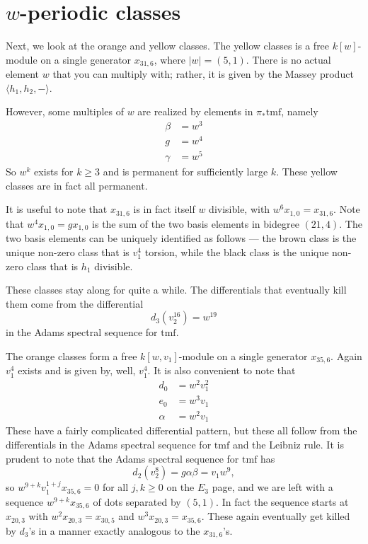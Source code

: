 \documentclass{shortart}
\newcommand\tmf{{\mathrm{tmf}}}
\begin{document}
\section{\texorpdfstring{$w$}{w}-periodic classes}
Next, we look at the orange and yellow classes. The yellow classes is a free $k[w]$-module on a single generator $x_{31, 6}$, where $|w| = (5, 1)$. There is no actual element $w$ that you can multiply with; rather, it is given by the Massey product $\langle h_1, h_2, -\rangle$.

However, some multiples of $w$ are realized by elements in $\pi_*\tmf$, namely
\[
  \begin{aligned}
    \beta &= w^3\\
    g &= w^4\\
    \gamma &= w^5
  \end{aligned}
\]
So $w^k$ exists for $k \geq 3$ and is permanent for sufficiently large $k$. These yellow classes are in fact all permanent.

It is useful to note that $x_{31, 6}$ is in fact itself $w$ divisible, with $w^6 x_{1, 0} = x_{31, 6}$. Note that $w^4 x_{1, 0} = g x_{1, 0}$ is the sum of the two basis elements in bidegree $(21, 4)$. The two basis elements can be uniquely identified as follows --- the brown class is the unique non-zero class that is $v_1^4$ torsion, while the black class is the unique non-zero class that is $h_1$ divisible.

These classes stay along for quite a while. The differentials that eventually kill them come from the differential
\[
  d_3(v_2^{16}) = w^{19}
\]
in the Adams spectral sequence for $\tmf$.

The orange classes form a free $k[w, v_1]$-module on a single generator $x_{35, 6}$. Again $v_1^4$ exists and is given by, well, $v_1^4$. It is also convenient to note that
\[
  \begin{aligned}
    d_0 &= w^2 v_1^2\\
    e_0 &= w^3 v_1\\
    \alpha &= w^2 v_1
  \end{aligned}
\]
These have a fairly complicated differential pattern, but these all follow from the differentials in the Adams spectral sequence for $\tmf$ and the Leibniz rule. It is prudent to note that the Adams spectral sequence for $\tmf$ has
\[
  d_2(v_2^8) = g \alpha \beta = v_1 w^9,
\]
so $w^{9 + k} v_1^{1 + j} x_{35, 6} = 0$ for all $j, k \geq 0$ on the $E_3$ page, and we are left with a sequence $w^{9 + k} x_{35, 6}$ of dots separated by $(5, 1)$. In fact the sequence starts at $x_{20, 3}$ with $w^2 x_{20, 3} = x_{30, 5}$ and $w^3 x_{20, 3} = x_{35, 6}$. These again eventually get killed by $d_3$'s in a manner exactly analogous to the $x_{31, 6}$'s.
\end{document}
